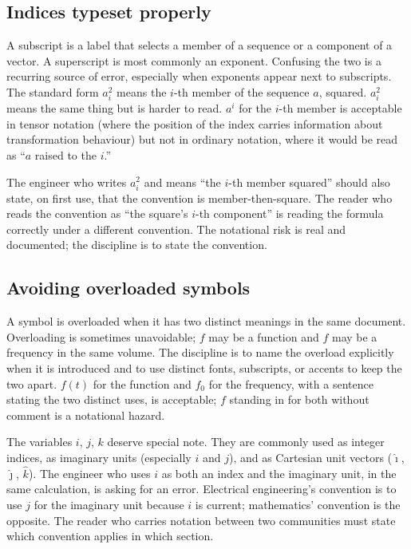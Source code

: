 \subsection{Indices typeset properly}

A subscript is a label that selects a member of a sequence or a
component of a vector. A superscript is most commonly an exponent.
Confusing the two is a recurring source of error, especially when
exponents appear next to subscripts. The standard form $a_{i}^{2}$
means the $i$-th member of the sequence $a$, squared. $a^{2}_{i}$
means the same thing but is harder to read. $a^{i}$ for the $i$-th
member is acceptable in tensor notation (where the position of the
index carries information about transformation behaviour) but not
in ordinary notation, where it would be read as ``$a$ raised to the
$i$.''

The engineer who writes $a_{i}^{2}$ and means ``the $i$-th member
squared'' should also state, on first use, that the convention is
member-then-square. The reader who reads the convention as
``the square's $i$-th component'' is reading the formula correctly
under a different convention. The notational risk is real and
documented; the discipline is to state the convention.

\subsection{Avoiding overloaded symbols}

A symbol is overloaded when it has two distinct meanings in the
same document. Overloading is sometimes unavoidable; $f$ may be a
function and $f$ may be a frequency in the same volume. The
discipline is to name the overload explicitly when it is introduced
and to use distinct fonts, subscripts, or accents to keep the two
apart. $f(t)$ for the function and $f_{0}$ for the frequency, with a
sentence stating the two distinct uses, is acceptable; $f$ standing
in for both without comment is a notational hazard.

The variables $i$, $j$, $k$ deserve special note. They are commonly
used as integer indices, as imaginary units (especially $i$ and
$j$), and as Cartesian unit vectors ($\hat{\imath}$, $\hat{\jmath}$,
$\hat{k}$). The engineer who uses $i$ as both an index and the
imaginary unit, in the same calculation, is asking for an error.
Electrical engineering's convention is to use $j$ for the imaginary
unit because $i$ is current; mathematics' convention is the
opposite. The reader who carries notation between two communities
must state which convention applies in which section.

